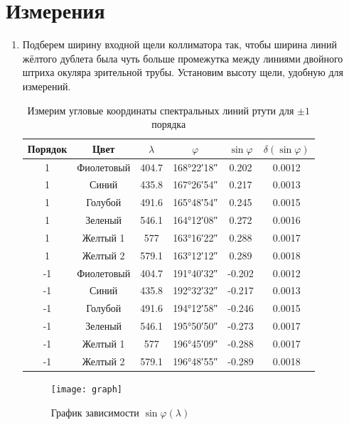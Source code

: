 \documentclass{letask}
\begin{document}
\section{Измерения}
\begin{enumerate}
  \item Подберем ширину входной щели коллиматора так, чтобы ширина линий жёлтого дублета была чуть больше промежутка между линиями двойного штриха окуляра зрительной трубы. Установим высоту щели, удобную для измерений.
\begin{table}[H]
\centering
\caption{Измерим угловые координаты спектральных линий ртути для $\pm 1$ порядка}
\begin{tabular}{|c|c|c|c|c|c|}
\hline
Порядок & Цвет & $\lambda$   & $\varphi$   & $\sin \varphi $  & $\delta (\sin \varphi)$\\ \hline
1       & Фиолетовый & 404.7 & \ang{168;22;18} & 0.202  & 0.0012 \\ \hline
1       & Синий      & 435.8 & \ang{167;26;54} & 0.217  & 0.0013 \\ \hline
1       & Голубой    & 491.6 & \ang{165;48;54} & 0.245  & 0.0015 \\ \hline
1       & Зеленый    & 546.1 & \ang{164;12;08} & 0.272  & 0.0016 \\ \hline
1       & Желтый 1   & 577   & \ang{163;16;22} & 0.288  & 0.0017 \\ \hline
1       & Желтый 2   & 579.1 & \ang{163;12;12} & 0.289  & 0.0018 \\ \hline
-1      & Фиолетовый & 404.7 & \ang{191;40;32} & -0.202 & 0.0012 \\ \hline
-1      & Синий      & 435.8 & \ang{192;32;32} & -0.217 & 0.0013 \\ \hline
-1      & Голубой    & 491.6 & \ang{194;12;58} & -0.246 & 0.0015 \\ \hline
-1      & Зеленый    & 546.1 & \ang{195;50;50} & -0.273 & 0.0017 \\ \hline
-1      & Желтый 1   & 577   & \ang{196;45;09} & -0.288 & 0.0017 \\ \hline
-1      & Желтый 2   & 579.1 & \ang{196;48;55} & -0.289 & 0.0018 \\ \hline
\end{tabular}
\end{table}

\begin{figure}[H]
\centering
	\texttt{[image: graph]}
	\caption{График зависимости $\sin \varphi (\lambda)$}
	\label{fig:graph}
\end{figure}


\end{enumerate}
\end{document}
